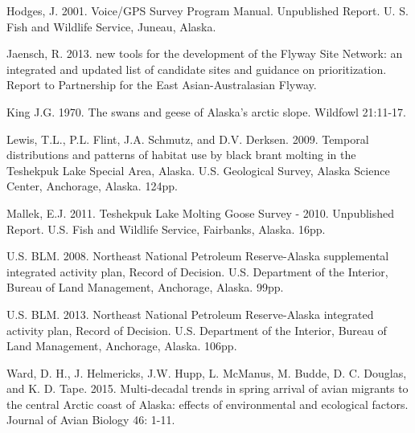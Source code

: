\documentclass[]{article}
\begin{document}
Hodges, J. 2001. Voice/GPS Survey Program Manual. Unpublished Report. U.
S. Fish and Wildlife Service, Juneau, Alaska.

Jaensch, R. 2013. new tools for the development of the Flyway Site
Network: an integrated and updated list of candidate sites and guidance
on prioritization. Report to Partnership for the East Asian-Australasian
Flyway.

King J.G. 1970. The swans and geese of Alaska's arctic slope. Wildfowl
21:11-17.

Lewis, T.L., P.L. Flint, J.A. Schmutz, and D.V. Derksen. 2009. Temporal
distributions and patterns of habitat use by black brant molting in the
Teshekpuk Lake Special Area, Alaska. U.S. Geological Survey, Alaska
Science Center, Anchorage, Alaska. 124pp.

Mallek, E.J. 2011. Teshekpuk Lake Molting Goose Survey - 2010.
Unpublished Report. U.S. Fish and Wildlife Service, Fairbanks, Alaska.
16pp.

U.S. BLM. 2008. Northeast National Petroleum Reserve-Alaska supplemental
integrated activity plan, Record of Decision. U.S. Department of the
Interior, Bureau of Land Management, Anchorage, Alaska. 99pp.

U.S. BLM. 2013. Northeast National Petroleum Reserve-Alaska integrated
activity plan, Record of Decision. U.S. Department of the Interior,
Bureau of Land Management, Anchorage, Alaska. 106pp.

Ward, D. H., J. Helmericks, J.W. Hupp, L. McManus, M. Budde, D. C.
Douglas, and K. D. Tape. 2015. Multi-decadal trends in spring arrival of
avian migrants to the central Arctic coast of Alaska: effects of
environmental and ecological factors. Journal of Avian Biology 46: 1-11.
\newpage
\footnotesize
\end{document}

